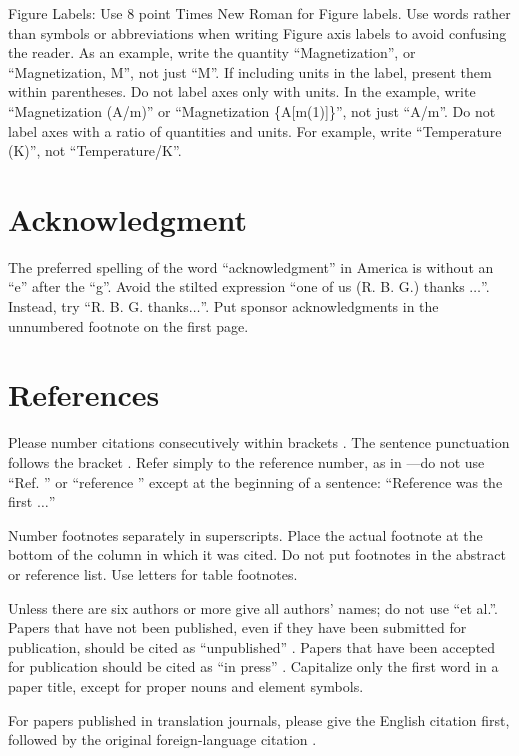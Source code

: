 \documentclass[conference]{IEEEtran}
\begin{document}
Figure Labels: Use 8 point Times New Roman for Figure labels. Use words 
rather than symbols or abbreviations when writing Figure axis labels to 
avoid confusing the reader. As an example, write the quantity 
``Magnetization'', or ``Magnetization, M'', not just ``M''. If including 
units in the label, present them within parentheses. Do not label axes only 
with units. In the example, write ``Magnetization (A/m)'' or ``Magnetization 
\{A[m(1)]\}'', not just ``A/m''. Do not label axes with a ratio of 
quantities and units. For example, write ``Temperature (K)'', not 
``Temperature/K''.

\section*{Acknowledgment}

The preferred spelling of the word ``acknowledgment'' in America is without 
an ``e'' after the ``g''. Avoid the stilted expression ``one of us (R. B. 
G.) thanks $\ldots$''. Instead, try ``R. B. G. thanks$\ldots$''. Put sponsor 
acknowledgments in the unnumbered footnote on the first page.

\section*{References}

Please number citations consecutively within brackets \cite{b1}. The 
sentence punctuation follows the bracket \cite{b2}. Refer simply to the reference 
number, as in \cite{b3}---do not use ``Ref. \cite{b3}'' or ``reference \cite{b3}'' except at 
the beginning of a sentence: ``Reference \cite{b3} was the first $\ldots$''

Number footnotes separately in superscripts. Place the actual footnote at 
the bottom of the column in which it was cited. Do not put footnotes in the 
abstract or reference list. Use letters for table footnotes.

Unless there are six authors or more give all authors' names; do not use 
``et al.''. Papers that have not been published, even if they have been 
submitted for publication, should be cited as ``unpublished'' \cite{b4}. Papers 
that have been accepted for publication should be cited as ``in press'' \cite{b5}. 
Capitalize only the first word in a paper title, except for proper nouns and 
element symbols.

For papers published in translation journals, please give the English 
citation first, followed by the original foreign-language citation \cite{b6}.



\begin{appendices}

\end{appendices}
\end{document}
